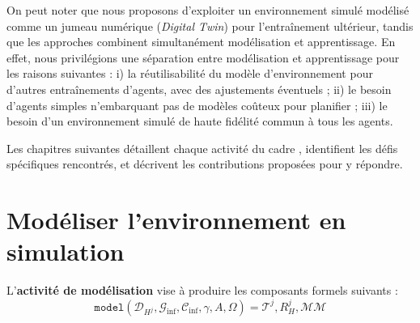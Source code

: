 \noindent On peut noter que nous proposons d'exploiter un environnement simulé modélisé comme un jumeau numérique (\textit{Digital Twin}) pour l'entraînement ultérieur, tandis que les approches  combinent simultanément modélisation et apprentissage. En effet, nous privilégions une séparation entre modélisation et apprentissage pour les raisons suivantes : i) la réutilisabilité du modèle d'environnement pour d'autres entraînements d'agents, avec des ajustements éventuels ; \quad ii) le besoin d'agents simples n'embarquant pas de modèles coûteux pour planifier ; \quad iii) le besoin d'un environnement simulé de haute fidélité commun à tous les agents.

\noindent Les chapitres suivantes détaillent chaque activité du cadre , identifient les défis spécifiques rencontrés, et décrivent les contributions proposées pour y répondre.


\chapter{Modéliser l'environnement en simulation}
\label{chap:modelling}

L'\textbf{activité de modélisation} vise à produire les composants formels suivants :
\begin{displaymath}
    \texttt{model}(\mathcal{D}_{H^j}, \mathcal{G}_{\text{inf}}, \mathcal{C}_{\text{inf}}, \gamma, A, \Omega) = \mathcal{T}^j, R^j_H, \mathcal{MM}
\end{displaymath}



